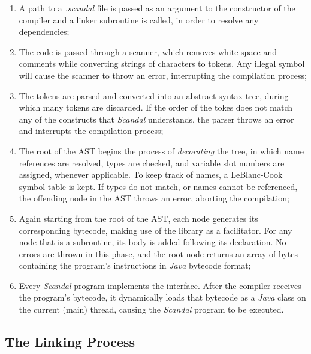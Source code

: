 \begin{enumerate}
	\item A path to a \emph{.scandal} file is passed as an argument to the constructor of the compiler and a linker subroutine is called, in order to resolve any dependencies;
	\item The code is passed through a scanner, which removes white space and comments while converting strings of characters to tokens. Any illegal symbol will cause the scanner to throw an error, interrupting the compilation process;
	\item The tokens are parsed and converted into an abstract syntax tree, during which many tokens are discarded. If the order of the tokes does not match any of the constructs that \emph{Scandal} understands, the parser throws an error and interrupts the compilation process;
	\item The root of the AST begins the process of \emph{decorating} the tree, in which name references are resolved, types are checked, and variable slot numbers are assigned, whenever applicable. To keep track of names, a LeBlanc-Cook symbol table is kept. If types do not match, or names cannot be referenced, the offending node in the AST throws an error, aborting the compilation;
	\item Again starting from the root of the AST, each node generates its corresponding bytecode, making use of the  library as a facilitator. For any node that is a subroutine, its body is added following its declaration. No errors are thrown in this phase, and the root node returns an array of bytes containing the program's instructions in \emph{Java} bytecode format;
	\item Every \emph{Scandal} program implements the  interface. After the compiler receives the program's bytecode, it dynamically loads that bytecode as a \emph{Java} class on the current (main) thread, causing the \emph{Scandal} program to be executed.
\end{enumerate}

\subsection{The Linking Process}

